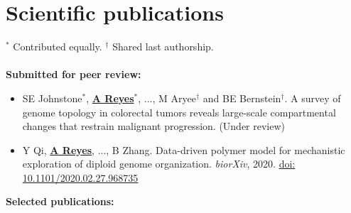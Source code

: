 \documentclass[11pt,a4paper,sans]{moderncv} %
\begin{document}
\section{Scientific publications}
\vspace{-.1cm}
\footnotesize{$^{\ast}$ Contributed equally.} \hspace{.5cm}
\footnotesize{$^{\dagger}$ Shared last authorship.} \\
\\
\vspace{-.1cm}
\textbf{Submitted for peer review:}
\begin{itemize}
\item SE Johnstone$^{\ast}$, \textbf{\underline{A Reyes}}$^{\ast}$,
  ..., M Aryee$^{\dagger}$ and BE Bernstein$^{\dagger}$. A survey of
  genome topology in colorectal tumors reveals large-scale
  compartmental changes that restrain malignant progression. (Under
  review)
\item Y Qi, \textbf{\underline{A Reyes}}, ..., B Zhang. Data-driven
  polymer model for mechanistic exploration of diploid genome
  organization. \textit{biorXiv},
  2020. \href{https://doi.org/10.1101/2020.02.27.968735}{doi: 10.1101/2020.02.27.968735}
\end{itemize}
\vspace{.1cm}
\textbf{Selected publications:}
\end{document}
